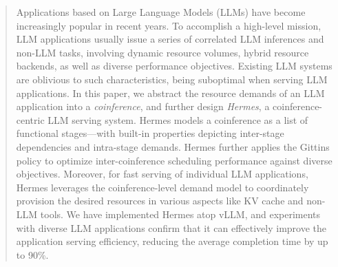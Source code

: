 \documentclass[letterpaper,twocolumn,10pt]{article}
\begin{document}
\begin{abstract}


Applications based on Large Language Models (LLMs) have become increasingly popular in recent years. 
To accomplish a high-level mission, LLM applications usually issue a series of correlated LLM inferences and non-LLM tasks, involving dynamic resource volumes, hybrid resource backends, as well as diverse performance objectives.
Existing LLM systems are oblivious to such characteristics, being suboptimal when serving LLM applications. 
In this paper, we abstract the resource demands of an LLM application into a \emph{coinference}, and further design \emph{Hermes}, a coinference-centric LLM serving system.
Hermes models a coinference as a list of functional stages---with built-in properties depicting inter-stage dependencies and intra-stage demands. 
Hermes further applies the Gittins policy to optimize inter-coinference scheduling performance against diverse objectives. %
Moreover, for fast serving of individual LLM applications, Hermes leverages the coinference-level demand model to coordinately provision the desired resources in various aspects like KV cache and non-LLM tools. 
We have implemented Hermes atop vLLM, and experiments with diverse LLM applications confirm that it can effectively improve the application serving efficiency, reducing the average completion time by up to 90\%. 

\end{abstract}
\end{document}
